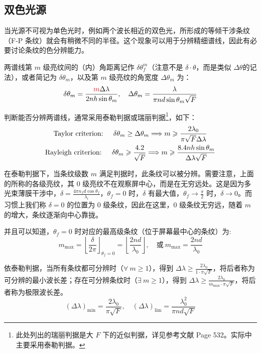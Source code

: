 \documentclass[UTF8]{report}
\theoremstyle{MyLineTheoremStyle} %
\theoremstyle{MyBlockTheoremStyle} %
\theoremstyle{MySubsubsectionStyle} %
\begin{document}
\subsection{双色光源}

当光源不可视为单色光时，例如两个波长相近的双色光，所形成的等倾干涉条纹（F-P 条纹）就会有稍微不同的半径。这个现象可以用于分辨精细谱线，因此有必要讨论条纹的色分辨能力。

两谱线第 $m$ 级亮纹间的（内）角距离记作 $\delta \theta_f^m$（注意不是 $\delta \cdot \theta$，而是类似 $\Delta \theta$的记法），或者简记为 $\delta \theta_m$，以及第 $m$ 级亮纹的角宽度 $\Delta \theta_m$ 为：
\begin{equation}
\delta \theta_m = \frac{{\color{red} m} \Delta \lambda}{2nh\sin \theta_m},\quad \Delta \theta_m = \frac{\lambda}{\pi n d \sin \theta_m\sqrt{F}}
\end{equation}

判断能否分辨两谱线，通常采用泰勒判据或瑞丽判据\footnote{此处列出的瑞丽判据是大 $F$ 下的近似判据，详见参考文献 \cite{Optics} Page 532。实际中主要采用泰勒判据。}，如下：
\begin{gather}
    \text{Taylor criterion: \quad } \delta \theta_m \geq \Delta \theta_m \Longrightarrow m \geqslant \frac{2\lambda_0}{\pi \sqrt{F} \Delta \lambda}
    \\
    \text{Rayleigh criterion: \quad } \delta \theta_m \geqslant \frac{4.2}{\sqrt{F}} \Longrightarrow m \geqslant \frac{8.4 n h \sin \theta_m}{\Delta \lambda \sqrt{F} }
\end{gather}

在泰勒判据下，当条纹级数 $m$ 满足判据时，此条纹可以被分辨。需要注意，上面的所称的各级亮纹，其 0 级亮纹不在观察屏中心，而是在无穷远处。这是因为多光束薄膜干涉中，$\delta = \frac{4 \pi n_f d \cos \theta_f}{\lambda_i}$，$\theta_f = 0$ 时，$\delta $ 有最大值，$\theta_f \to \frac{\pi}{2}$ 时，$\delta \to 0$。而习惯上我们称 $\delta = 0$ 的位置为 0 级条纹，因此在这里，0 级条纹无穷远，随着 $m$ 的增大，条纹逐渐向中心靠拢。

并且可以知道，$\theta_f = 0$ 时对应的最高级条纹（位于屏幕最中心的条纹）为:
\begin{equation}
m_{\max} =  \left \lfloor \frac{\delta}{2\pi} \right \rfloor_{\theta_f = 0} = \left \lfloor \frac{2nd}{\lambda_0} \right \rfloor,\quad \text{或}\  m_{\max} = \frac{2nd}{\lambda_0}
\end{equation}

依泰勒判据，当所有条纹都可分辨时（$\forall\ m \geqslant 1$），得到 $\Delta \lambda \geqslant \frac{2\lambda_0}{1\cdot \pi \sqrt{F}}$，将后者称为可分辨的最小波长差；存在可分辨条纹时（$\exists\ m \geqslant 1$），得到 $\Delta \lambda \geqslant \frac{2\lambda_0}{m_{\max}\cdot \pi \sqrt{F}}$，将后者称为极限波长差。
\begin{equation}
    (\Delta \lambda)_{\min} = \frac{2\lambda_0}{\pi \sqrt{F}}
    ,\quad 
    (\Delta \lambda)_{\lim} = \frac{\lambda_0^2}{\pi n d \sqrt{F}  }
\end{equation}
\end{document}
